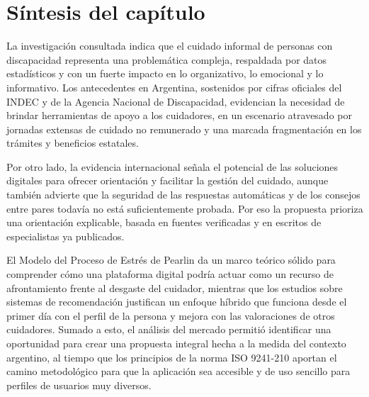 \section{Síntesis del capítulo}

La investigación consultada indica que el cuidado informal de personas con discapacidad representa una problemática compleja, respaldada por datos estadísticos y con un fuerte impacto en lo organizativo, lo emocional y lo informativo. Los antecedentes en Argentina, sostenidos por cifras oficiales del INDEC y de la Agencia Nacional de Discapacidad, evidencian la necesidad de brindar herramientas de apoyo a los cuidadores, en un escenario atravesado por jornadas extensas de cuidado no remunerado y una marcada fragmentación en los trámites y beneficios estatales.

Por otro lado, la evidencia internacional señala el potencial de las soluciones digitales para ofrecer orientación y facilitar la gestión del cuidado, aunque también advierte que la seguridad de las respuestas automáticas y de los consejos entre pares todavía no está suficientemente probada. Por eso la propuesta prioriza una orientación explicable, basada en fuentes verificadas y en escritos de especialistas ya publicados.

El Modelo del Proceso de Estrés de Pearlin da un marco teórico sólido para comprender cómo una plataforma digital podría actuar como un recurso de afrontamiento frente al desgaste del cuidador, mientras que los estudios sobre sistemas de recomendación justifican un enfoque híbrido que funciona desde el primer día con el perfil de la persona y mejora con las valoraciones de otros cuidadores. Sumado a esto, el análisis del mercado permitió identificar una oportunidad para crear una propuesta integral hecha a la medida del contexto argentino, al tiempo que los principios de la norma ISO 9241-210 aportan el camino metodológico para que la aplicación sea accesible y de uso sencillo para perfiles de usuarios muy diversos.

